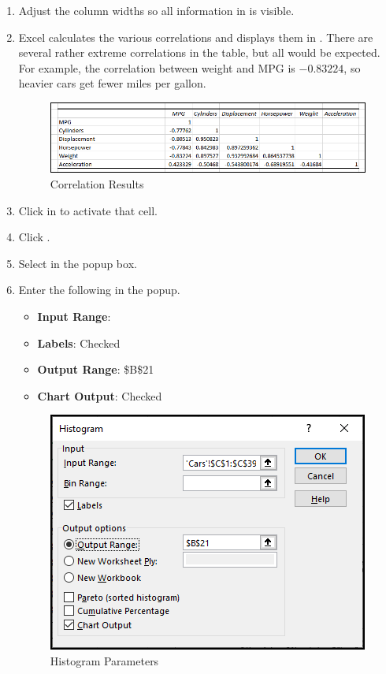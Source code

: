 \begin{enumerate}[resume]
	\item Adjust the column widths so all information in  is visible.
	\item Excel calculates the various correlations and displays them in . There are several rather extreme correlations in the table, but all would be expected. For example, the correlation between weight and MPG is $ -0.83224 $, so heavier cars get fewer miles per gallon.
	
	\begin{figure}[H]
		\centering
		\includegraphics[width=\maxwidth{.95\linewidth}]{gfx/ch09_fig75}
		\caption{Correlation Results}
		\label{09:fig75}
	\end{figure}

	\item Click in  to activate that cell.
	\item Click .
	\item Select  in the  popup box.
	\item Enter the following in the  popup.

	\begin{itemize}
		\item \textbf{Input Range}: 
		\item \textbf{Labels}: Checked
		\item \textbf{Output Range}: \$B\$21
		\item \textbf{Chart Output}: Checked
	\end{itemize}
	
	\begin{figure}[H]
		\centering
		\includegraphics[width=\maxwidth{.95\linewidth}]{gfx/ch09_fig76}
		\caption{Histogram Parameters}
		\label{09:fig76}
	\end{figure}


\end{enumerate}
